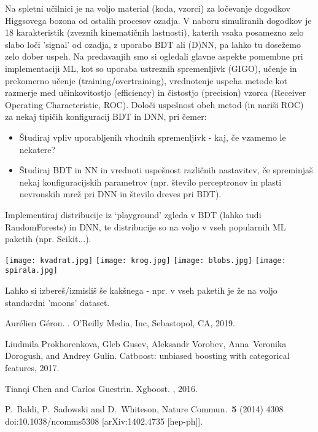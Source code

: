 \documentclass[slovene,11pt,a4paper]{article}
\begin{document}
 Na spletni učilnici je na voljo material (koda, vzorci) za 
ločevanje dogodkov Higgsovega bozona od ostalih procesov ozadja. V naboru simuliranih 
dogodkov je 18 karakteristik (zveznih kinematičnih lastnosti), katerih vsaka 
posamezno zelo slabo loči 'signal' od ozadja, z uporabo BDT ali (D)NN, pa lahko tu dosežemo
zelo dober uspeh.  Na predavanjih smo si ogledali glavne aspekte pomembne pri implementaciji ML, 
kot so  uporaba ustreznih spremenljivk (GIGO), učenje in prekomerno učenje (training/overtraining), 
vrednotenje uspeha metode kot razmerje med učinkovitostjo (efficiency) in čistostjo (precision) 
vzorca (Receiver Operating Characteristic, ROC). Določi uspešnost obeh metod (in nariši ROC) 
za nekaj tipičih konfiguracij BDT in DNN, pri čemer:
\begin{itemize}
  \item Študiraj vpliv uporabljenih vhodnih spremenljivk - kaj, če vzamemo le nekatere?
  \item Študiraj BDT in NN in vrednoti uspešnost različnih nastavitev,  če spreminjaš nekaj konfiguracijskih parametrov
  (npr. število perceptronov in plasti nevronskih mrež pri DNN in število dreves pri BDT). 
\end{itemize}


 Implementiraj distribucije iz ‘playground’ zgleda v BDT (lahko tudi RandomForests) in DNN,
te distribucije so na voljo v vseh popularnih ML paketih (npr. Scikit...).
\begin{center}
  \texttt{[image: kvadrat.jpg]}
  \texttt{[image: krog.jpg]} 
  \texttt{[image: blobs.jpg]}
  \texttt{[image: spirala.jpg]}

\end{center}
Lahko  si izbereš/izmisliš še kakšnega - npr. v vseh paketih je že na voljo standardni 'moons' dataset.



%

\begin{thebibliography}{1}
 
  
  Aur\'{e}lien G\'{e}ron.
  .
  \newblock O'Reilly Media, Inc, Sebastopol, CA, 2019.
  
  Liudmila Prokhorenkova, Gleb Gusev, Aleksandr Vorobev, Anna~Veronika Dorogush,
    and Andrey Gulin.
  \newblock Catboost: unbiased boosting with categorical features, 2017.

  Tianqi Chen and Carlos Guestrin.
  \newblock Xgboost.
  , 2016.

P.~Baldi, P.~Sadowski and D.~Whiteson,
Nature Commun.\  {\bf 5} (2014) 4308
doi:10.1038/ncomms5308
[arXiv:1402.4735 [hep-ph]].
\end{thebibliography}
\end{document}
